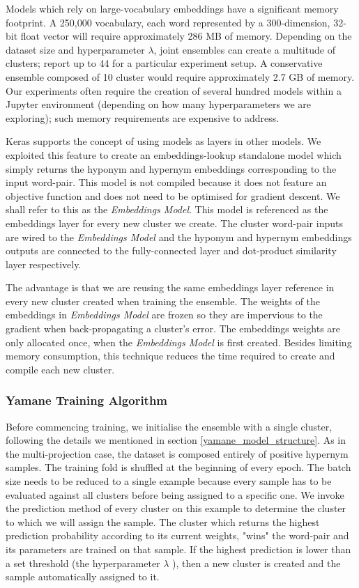 Models which rely on large-vocabulary embeddings have a significant memory footprint.  A 250,000 vocabulary, each word represented by a 300-dimension, 32-bit float vector will require approximately 286 MB of memory.  Depending on the dataset size and hyperparameter $\lambda$, joint ensembles can create a multitude of clusters;  \citep{yamane2016distributional} report up to 44 for a particular experiment setup.
A conservative ensemble composed of 10 cluster would require approximately 2.7 GB of memory.  Our experiments often require the creation of several hundred models within a Jupyter environment (depending on how many hyperparameters we are exploring); such memory requirements are expensive to address.

Keras supports the concept of using models as layers in other models.  We exploited this feature to create an embeddings-lookup standalone model which simply returns the hyponym and hypernym embeddings corresponding to the input word-pair.  This model is not compiled because it does not feature an objective function and does not need to be optimised for gradient descent. We shall refer to this as the \textit{Embeddings Model}.  This model is referenced as the embeddings layer for every new cluster we create.  The cluster word-pair inputs are wired to the \textit{Embeddings Model} and the hyponym and hypernym embeddings outputs are connected to the fully-connected layer and dot-product similarity layer respectively.

The advantage is that we are reusing the same embeddings layer reference in every new cluster created when training the ensemble.  The weights of the embeddings in \textit{Embeddings Model} are frozen so they are impervious to the gradient when back-propagating a cluster's error.  The embeddings weights are only allocated once, when the \textit{Embeddings Model} is first created.  Besides limiting memory consumption, this technique reduces the time required to create and compile each new cluster.

\subsubsection{Yamane Training Algorithm}
Before commencing training, we initialise the ensemble with a single cluster, following the details we mentioned in section \ref{yamane_model_structure}.  As in the multi-projection case, the dataset is composed entirely of positive hypernym samples.  The training fold is shuffled at the beginning of every epoch.  The batch size needs to be reduced to a single example because every sample has to be evaluated against all clusters before being assigned to a specific one.  We invoke the prediction method of every cluster on this example to determine the cluster to which we will assign the sample.  The cluster which returns the highest prediction probability according to its current weights, "wins" the word-pair and its parameters are trained on that sample.  If the highest prediction is lower than a set threshold (the hyperparameter $\lambda$ ), then a new cluster is created and the sample automatically assigned to it.

